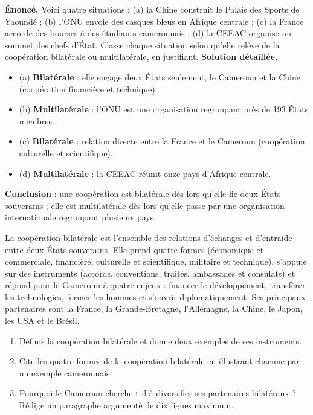 \documentclass[11pt]{article}
\begin{document}
\begin{exoresolu}
\textbf{Énoncé.} Voici quatre situations : (a) la Chine construit le Palais des Sports de Yaoundé ; (b) l'ONU envoie des casques bleus en Afrique centrale ; (c) la France accorde des bourses à des étudiants camerounais ; (d) la CEEAC organise un sommet des chefs d'État. Classe chaque situation selon qu'elle relève de la coopération bilatérale ou multilatérale, en justifiant.
\tcblower
\textbf{Solution détaillée.}
\begin{itemize}
\item (a) \textbf{Bilatérale} : elle engage deux États seulement, le Cameroun et la Chine (coopération financière et technique).
\item (b) \textbf{Multilatérale} : l'ONU est une organisation regroupant près de 193 États membres.
\item (c) \textbf{Bilatérale} : relation directe entre la France et le Cameroun (coopération culturelle et scientifique).
\item (d) \textbf{Multilatérale} : la CEEAC réunit onze pays d'Afrique centrale.
\end{itemize}
\textbf{Conclusion} : une coopération est bilatérale dès lors qu'elle lie deux États souverains ; elle est multilatérale dès lors qu'elle passe par une organisation internationale regroupant plusieurs pays.
\end{exoresolu}

\begin{aretenir}
La coopération bilatérale est l'ensemble des relations d'échanges et d'entraide entre deux États souverains. Elle prend quatre formes (économique et commerciale, financière, culturelle et scientifique, militaire et technique), s'appuie sur des instruments (accords, conventions, traités, ambassades et consulats) et répond pour le Cameroun à quatre enjeux : financer le développement, transférer les technologies, former les hommes et s'ouvrir diplomatiquement. Ses principaux partenaires sont la France, la Grande-Bretagne, l'Allemagne, la Chine, le Japon, les USA et le Brésil.
\end{aretenir}

\begin{exercice}
\begin{enumerate}
\item Définis la coopération bilatérale et donne deux exemples de ses instruments.
\item Cite les quatre formes de la coopération bilatérale en illustrant chacune par un exemple camerounais.
\item Pourquoi le Cameroun cherche-t-il à diversifier ses partenaires bilatéraux ? Rédige un paragraphe argumenté de dix lignes maximum.
\end{enumerate}
\end{exercice}
\end{document}
